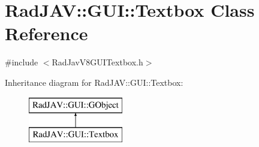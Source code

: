 \hypertarget{class_rad_j_a_v_1_1_g_u_i_1_1_textbox}{}\section{Rad\+J\+AV\+:\+:G\+UI\+:\+:Textbox Class Reference}
\label{class_rad_j_a_v_1_1_g_u_i_1_1_textbox}


{\ttfamily \#include $<$Rad\+Jav\+V8\+G\+U\+I\+Textbox.\+h$>$}

Inheritance diagram for Rad\+J\+AV\+:\+:G\+UI\+:\+:Textbox\+:\begin{figure}[H]
\begin{center}
\leavevmode
\includegraphics[height=2.000000cm]{class_rad_j_a_v_1_1_g_u_i_1_1_textbox}
\end{center}
\end{figure}
